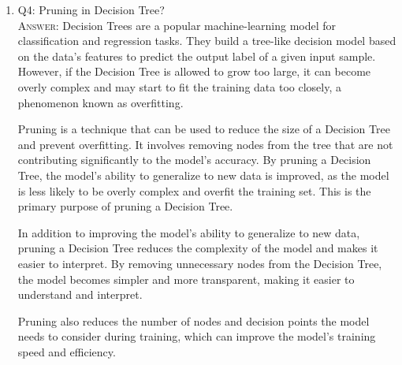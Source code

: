 \documentclass[11pt]{article}
\begin{document}
\begin{enumerate}
\item Q4: Pruning in Decision Tree?\\
\textsc{Answer:} Decision Trees are a popular machine-learning model for classification and regression tasks. They build a tree-like decision model based on the data's features to predict the output label of a given input sample. However, if the Decision Tree is allowed to grow too large, it can become overly complex and may start to fit the training data too closely, a phenomenon known as overfitting. 

Pruning is a technique that can be used to reduce the size of a Decision Tree and prevent overfitting. It involves removing nodes from the tree that are not contributing significantly to the model's accuracy. By pruning a Decision Tree, the model's ability to generalize to new data is improved, as the model is less likely to be overly complex and overfit the training set. This is the primary purpose of pruning a Decision Tree.

In addition to improving the model's ability to generalize to new data, pruning a Decision Tree reduces the complexity of the model and makes it easier to interpret. By removing unnecessary nodes from the Decision Tree, the model becomes simpler and more transparent, making it easier to understand and interpret.

Pruning also reduces the number of nodes and decision points the model needs to consider during training, which can improve the model's training speed and efficiency.

\end{enumerate}
















	
	\newpage
	
	
\end{document}
